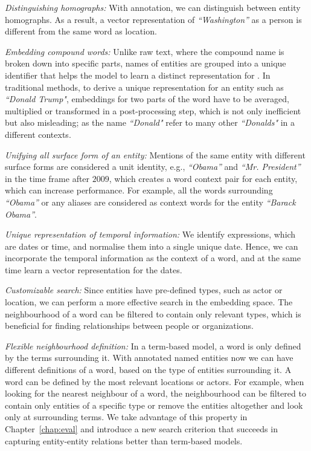 \begin{compactitem}
\item \emph{Distinguishing homographs:} With annotation, we can distinguish between entity homographs. As a result, a vector representation of \emph{``Washington''} as a person is different from the same word as  location. 
\item \emph{Embedding compound words:}  Unlike raw text, where the compound name is broken down into specific parts, names of entities are grouped into a unique identifier that helps the model to learn a distinct representation for . In traditional methods, to derive a unique representation for an entity such as \emph{``Donald Trump"}, embeddings for two parts of the word have to be averaged, multiplied or transformed in a  post-processing step, which is not only inefficient but also misleading; as the name \emph{``Donald"}  refer to many other \emph{``Donalds"} in a different contexts. 
\item \emph{Unifying all surface form of an entity:} Mentions of the same entity with different surface forms are considered a unit identity, e.g., \emph{``Obama''} and \emph{``Mr. President''} in the time frame after $2009$, which creates a word context pair for each entity, which can increase performance. For example, all the words surrounding \emph{``Obama''} or any aliases are considered as context words for the entity \emph{``Barack Obama''}. 
\item \emph{Unique representation of temporal information:} We identify expressions, which are dates or time, and normalise them into a single unique date. Hence, we can incorporate the temporal information as the context of a word, and at the same time learn a vector representation for the dates.
\item \emph{Customizable search:} Since entities have pre-defined types, such as actor or location, we can perform a more effective search in the embedding space. The neighbourhood of a word can be filtered to contain only relevant types, which is beneficial for finding relationships between people or organizations. 
\item \emph{Flexible neighbourhood definition:} In a term-based model, a word is only defined by the terms surrounding it. With annotated named entities now we can have different definitions of a word, based on the type of entities surrounding it.
A word can be defined by the most relevant locations or actors. For example, when looking for the nearest neighbour of a word, the neighbourhood can be filtered to contain only entities of a specific type or remove the entities altogether and look only at surrounding terms. We take advantage of this property in Chapter~\ref{chap:eval} and introduce a new search criterion that succeeds in capturing entity-entity relations better than term-based models.\\
\end{compactitem}
